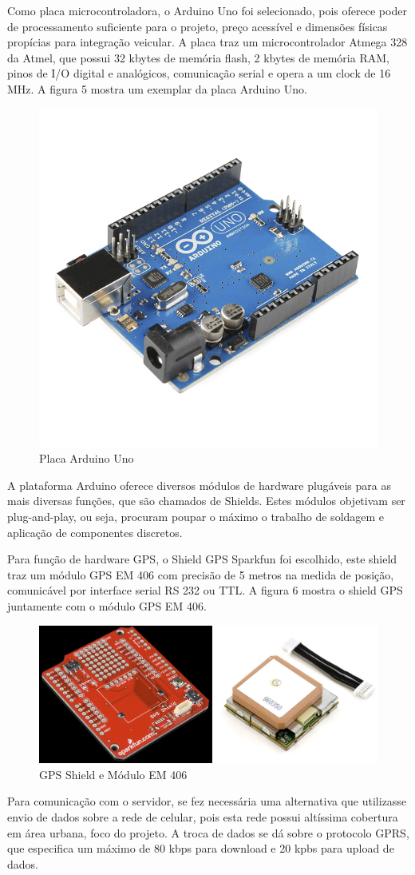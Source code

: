 Como placa microcontroladora, o Arduino Uno foi selecionado, pois oferece
poder de processamento suficiente para o projeto, preço acessível e dimensões
físicas propícias para integração veicular. A placa traz um microcontrolador
Atmega 328 da Atmel, que possui 32 kbytes de memória flash, 2 kbytes de memória
RAM, pinos de I/O digital e analógicos, comunicação serial e opera a um clock de
16 MHz. A figura 5 mostra um exemplar da placa Arduino Uno.

\begin{figure}[!htb]
\centering
\includegraphics[width=3.00cm\textwidth]{figures/arduinoUno.jpg}
\caption{Placa Arduino Uno}
\label{Figura 5}
\end{figure}

A plataforma Arduino oferece diversos módulos de hardware plugáveis
para as mais diversas funções, que são chamados de Shields. Estes módulos
objetivam ser plug-and-play, ou seja, procuram poupar o máximo o trabalho
de soldagem e aplicação de componentes discretos.

Para função de hardware GPS, o Shield GPS Sparkfun foi escolhido, este shield
traz um módulo GPS EM 406 com precisão de 5 metros na medida de posição, comunicável
por interface serial RS 232 ou TTL. A figura 6 mostra o shield GPS juntamente com o 
módulo GPS EM 406.

\begin{figure}[!htb]
\centering
\includegraphics[width=7.00cm\textwidth]{figures/6_gps.png}
\caption{GPS Shield e Módulo EM 406}
\label{Figura 6}
\end{figure}

Para comunicação com o servidor, se fez necessária uma alternativa que utilizasse
envio de dados sobre a rede de celular, pois esta rede possui altíssima cobertura
em área urbana, foco do projeto. A troca de dados se dá sobre o protocolo GPRS, que
especifica um máximo de 80 kbps para download e 20 kpbs para upload de dados.

